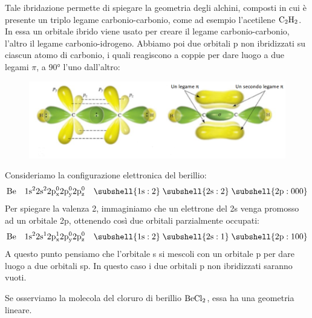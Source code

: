 Tale ibridazione permette di spiegare la geometria degli alchini, composti in cui è presente un triplo legame carbonio-carbonio, come ad esempio l'acetilene $\rm C_2H_2$. In essa un orbitale ibrido viene usato per creare il legame carbonio-carbonio, l'altro il legame carbonio-idrogeno. Abbiamo poi due orbitali p non ibridizzati su ciascun atomo di carbonio, i quali reagiscono a coppie per dare luogo a due legami $\pi$, a 90° l'uno dall'altro:

\begin{figure}[htp]
    \centering
    \includegraphics[width=14cm]{immagini/acetilene.png}
\end{figure}

Consideriamo la configurazione elettronica del berillio:
$$\rm Be \quad 1s^22s^22p_x^02p_y^02p_z^0 \quad \subshell{1s:2} \; \subshell{2s:2} \; \subshell{2p:000}$$
Per spiegare la valenza 2, immaginiamo che un elettrone del 2s venga promosso ad un orbitale 2p, ottenendo così due orbitali parzialmente occupati:
$$\rm Be \quad 1s^22s^12p_x^12p_y^02p_z^0 \quad \subshell{1s:2} \; \subshell{2s:1} \; \subshell{2p:100}$$
A questo punto pensiamo che l'orbitale s si mescoli con un orbitale p per dare luogo a due orbitali sp. In questo caso i due orbitali p non ibridizzati saranno vuoti. 

Se osserviamo la molecola del cloruro di berillio $\rm BeCl_2$, essa ha una geometria lineare.

